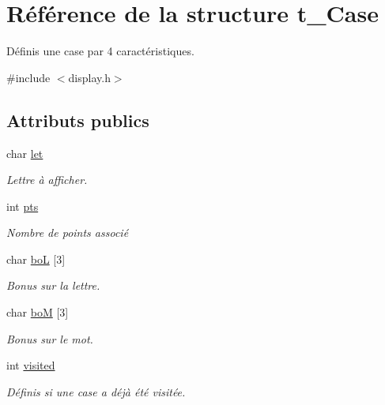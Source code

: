\hypertarget{structt__Case}{\section{Référence de la structure t\+\_\+\+Case}
\label{structt__Case}
}


Définis une case par 4 caractéristiques.  




{\ttfamily \#include $<$display.\+h$>$}

\subsection*{Attributs publics}
\begin{DoxyCompactItemize}
\item 
\hypertarget{structt__Case_ab8d4688c0772235234ba57f91302d301}{char \hyperlink{structt__Case_ab8d4688c0772235234ba57f91302d301}{let}}\label{structt__Case_ab8d4688c0772235234ba57f91302d301}

\begin{DoxyCompactList}\small\item\em Lettre à afficher. \end{DoxyCompactList}\item 
\hypertarget{structt__Case_a0ca7fb3ede63f530b081a9ba25dd0c42}{int \hyperlink{structt__Case_a0ca7fb3ede63f530b081a9ba25dd0c42}{pts}}\label{structt__Case_a0ca7fb3ede63f530b081a9ba25dd0c42}

\begin{DoxyCompactList}\small\item\em Nombre de points associé \end{DoxyCompactList}\item 
\hypertarget{structt__Case_ac6a23400b09f5d278e5fa52bca741391}{char \hyperlink{structt__Case_ac6a23400b09f5d278e5fa52bca741391}{bo\+L} \mbox{[}3\mbox{]}}\label{structt__Case_ac6a23400b09f5d278e5fa52bca741391}

\begin{DoxyCompactList}\small\item\em Bonus sur la lettre. \end{DoxyCompactList}\item 
\hypertarget{structt__Case_a5eede5d51107927662912a5b307fe6ee}{char \hyperlink{structt__Case_a5eede5d51107927662912a5b307fe6ee}{bo\+M} \mbox{[}3\mbox{]}}\label{structt__Case_a5eede5d51107927662912a5b307fe6ee}

\begin{DoxyCompactList}\small\item\em Bonus sur le mot. \end{DoxyCompactList}\item 
\hypertarget{structt__Case_a36f323f054e3e6e6a95654b63bd90652}{int \hyperlink{structt__Case_a36f323f054e3e6e6a95654b63bd90652}{visited}}\label{structt__Case_a36f323f054e3e6e6a95654b63bd90652}

\begin{DoxyCompactList}\small\item\em Définis si une case a déjà été visitée. \end{DoxyCompactList}\end{DoxyCompactItemize}



